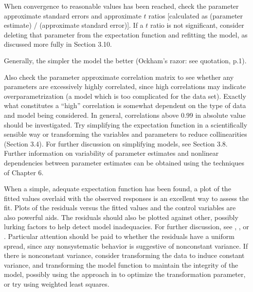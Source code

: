 When convergence to reasonable values has been reached, check the
parameter approximate standard errors and approximate $t$ ratios
[calculated as (parameter estimate) / (approximate standard error)].
If a $t$ ratio is not significant,
consider deleting that parameter from the expectation
function and refitting the model, as discussed more fully
in Section 3.10.

Generally, the simpler the model the better
(Ockham's razor: see quotation, p.1).

Also check the parameter approximate correlation matrix to see
whether any parameters are excessively highly correlated,
since high correlations may indicate overparametrization
(a model which is too complicated for the data set).
Exactly what constitutes a ``high''
correlation is somewhat dependent on the type of data and model
being considered.
In general, correlations above 0.99 in absolute value should be
investigated.
Try simplifying the expectation function in a
scientifically sensible way or transforming the variables and
parameters to reduce collinearities (Section 3.4).
For further discussion on simplifying models, see Section 3.8.
Further information on variability of parameter estimates and
nonlinear dependencies between parameter estimates can be obtained
using the techniques of Chapter 6.

When a simple, adequate expectation function has been found, a
plot of the fitted values overlaid with the observed responses
is an excellent way to assess the fit.
Plots of the residuals versus the fitted values and the control
variables are also powerful aids.
The residuals should also be plotted against other, possibly
lurking factors to help detect model inadequacies.
For further discussion, see ,
, or .
Particular attention should be paid to whether the residuals have
a uniform spread, since any nonsystematic behavior is suggestive
of nonconstant variance.
If there is nonconstant variance, consider transforming the data
to induce constant variance, and transforming the model function
to maintain the integrity of the model, possibly using the approach in
 to optimize the transformation parameter,
or try using weighted least squares.

